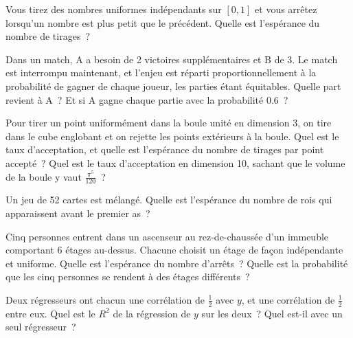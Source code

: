
\begin{question}\label{iq:iv1:timed-test-8:7}
Vous tirez des nombres uniformes indépendants sur $[0, 1]$ et vous arrêtez lorsqu'un nombre est plus petit que le précédent. Quelle est l'espérance du nombre de tirages~?
\end{question}

\begin{question}\label{iq:iv1:timed-test-8:8}
Dans un match, A a besoin de 2 victoires supplémentaires et B de 3. Le match est interrompu maintenant, et l'enjeu est réparti proportionnellement à la probabilité de gagner de chaque joueur, les parties étant équitables. Quelle part revient à A~? Et si A gagne chaque partie avec la probabilité $0.6$~?
\end{question}

\begin{question}\label{iq:iv1:timed-test-8:9}
Pour tirer un point uniformément dans la boule unité en dimension 3, on tire dans le cube englobant et on rejette les points extérieurs à la boule. Quel est le taux d'acceptation, et quelle est l'espérance du nombre de tirages par point accepté~? Quel est le taux d'acceptation en dimension 10, sachant que le volume de la boule y vaut $\frac{\pi^5}{120}$~?
\end{question}

\begin{question}\label{iq:iv1:timed-test-8:10}
Un jeu de 52 cartes est mélangé. Quelle est l'espérance du nombre de rois qui apparaissent avant le premier as~?
\end{question}

\begin{question}\label{iq:iv1:timed-test-8:11}
Cinq personnes entrent dans un ascenseur au rez-de-chaussée d'un immeuble comportant 6 étages au-dessus. Chacune choisit un étage de façon indépendante et uniforme. Quelle est l'espérance du nombre d'arrêts~? Quelle est la probabilité que les cinq personnes se rendent à des étages différents~?
\end{question}

\begin{question}\label{iq:iv1:timed-test-8:12}
Deux régresseurs ont chacun une corrélation de $\frac12$ avec $y$, et une corrélation de $\frac12$ entre eux. Quel est le $R^2$ de la régression de $y$ sur les deux~? Quel est-il avec un seul régresseur~?
\end{question}
